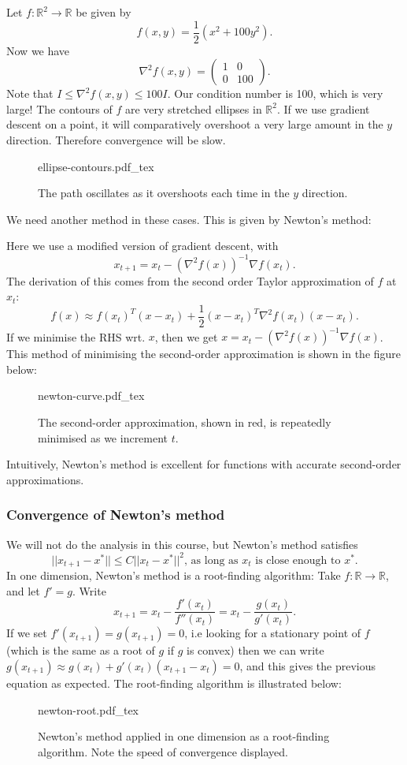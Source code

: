 \documentclass[a4paper]{scrartcl}
\newcommand{\incfig}[2]{%
    \def\svgwidth{#1mm}
    {#2.pdf_tex}
}
\begin{document}
\begin{example*}
	Let $f: \mathbb{R}^{2} \to \mathbb{R} $ be given by 
	\[f(x,y)=\frac{1}{2}(x^2+100y^2).\]
	Now we have 
	\[\nabla^2 f (x,y)=\begin{pmatrix}
	1&0\\0&100
	\end{pmatrix}
	.\]
	Note that $I\leq \nabla^2 f (x,y)\leq 100I$. Our condition number is 100, which is very large! The contours of $f$ are very stretched ellipses in $\mathbb{R}^2$. If we use gradient descent on a point, it will comparatively overshoot a very large amount in the $y$ direction. Therefore convergence will be slow.
	\begin{figure}[H]
		\centering
		\incfig{70}{ellipse-contours}
		\caption{The path oscillates as it overshoots each time in the $y$ direction.}
	\end{figure}
\end{example*}
We need another method in these cases. This is given by Newton's method:
\begin{definition*}
	 Here we use a modified version of gradient descent, with 
	 \[x_{t+1}=x_t-(\nabla^2 f (x))^{-1}\nabla f (x_t).\]
	 The derivation of this comes from the second order Taylor approximation of $f$ at $x_t$: 
	 \[f(x)\approx f (x_t)^T (x-x_t)+\frac{1}{2}(x-x_t)^T \nabla^2 f (x_t)(x-x_t).\]
	 If we minimise the RHS wrt. $x$, then we get $x=x_t-(\nabla^2 f(x))^{-1}\nabla f (x)$. This method of minimising the second-order approximation is shown in the figure below:
	 \begin{figure}[H]
		\centering
		\incfig{70}{newton-curve}
		\caption{The second-order approximation, shown in red, is repeatedly minimised as we increment $t$.}
	\end{figure}
	 
\end{definition*}
\begin{remark}
	Intuitively, Newton's method is excellent for functions with accurate second-order approximations.
\end{remark}
\subsubsection{Convergence of Newton's method}
We will not do the analysis in this course, but Newton's method satisfies 
\[||x_{t+1}-x^*||\leq C ||x_t-x^*||^2 \text{, as long as } x_t \text{ is close enough to } x^*.\]
In one dimension, Newton's method is a root-finding algorithm:\newline 
Take $f: \mathbb{R} \to \mathbb{R}$, and let $f'=g$. Write 
\[x_{t+1}=x_t-\frac{f'(x_t)}{f'' (x_t)}=x_t-\frac{g (x_t)}{g' (x_t)}.\]
If we set $f'(x_{t+1})=g (x_{t+1})=0$, i.e looking for a stationary point of $f$ (which is the same as a root of $g$ if $g$ is convex) then we can write $g (x_{t+1})\approx g (x_{t})+g' (x_t)(x_{t+1}-x_t)=0$, and this gives the previous equation as expected. The root-finding algorithm is illustrated below:
\begin{figure}[H]
	\centering
	\incfig{70}{newton-root}
	\caption{Newton's method applied in one dimension as a root-finding algorithm. Note the speed of convergence displayed.}
\end{figure}
\end{document}
